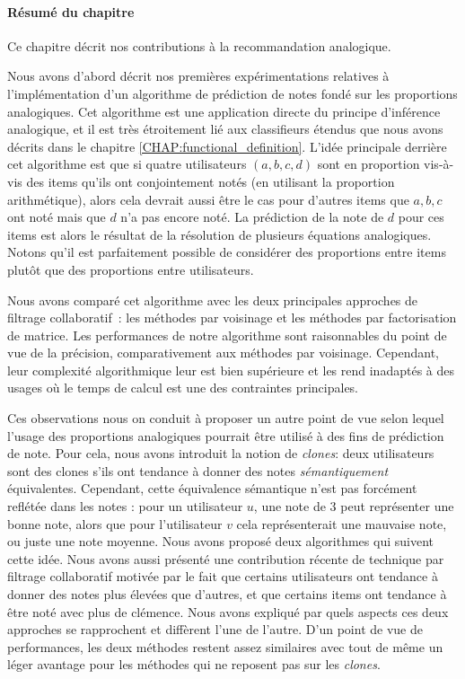 \paragraph{Résumé du chapitre}

Ce chapitre décrit nos contributions à la recommandation analogique.

Nous avons d'abord décrit nos premières expérimentations relatives  à
l'implémentation d'un algorithme de prédiction de notes fondé sur les
proportions analogiques. Cet algorithme est une application directe du principe
d'inférence analogique, et il est très étroitement lié aux classifieurs étendus
que nous avons décrits dans le chapitre \ref{CHAP:functional_definition}.
L'idée principale derrière cet algorithme est que si quatre utilisateurs $(a,
b, c, d)$ sont en proportion vis-à-vis des items qu'ils ont conjointement notés
(en utilisant la proportion arithmétique), alors cela devrait aussi être le cas
pour d'autres items que $a, b, c$ ont noté mais que $d$ n'a pas encore noté. La
prédiction de la note de $d$ pour ces items est alors le résultat de la
résolution de plusieurs équations analogiques. Notons qu'il est parfaitement
possible de considérer des proportions entre items plutôt que des proportions
entre utilisateurs.

Nous avons comparé cet algorithme avec les deux principales approches de
filtrage collaboratif~: les méthodes par voisinage et les méthodes par
factorisation de matrice. Les performances de notre algorithme sont raisonnables
du point de vue de la précision, comparativement aux méthodes par voisinage.
Cependant, leur complexité algorithmique leur est bien supérieure et les rend
inadaptés à des usages où le temps de calcul est une des contraintes
principales.

Ces observations nous on conduit à proposer un autre point de vue selon lequel
l'usage des proportions analogiques pourrait  être utilisé  à des fins de
prédiction de note. Pour cela, nous avons introduit la notion de
\textit{clones}: deux utilisateurs sont des clones s'ils ont tendance à donner
des notes \textit{sémantiquement} équivalentes. Cependant, cette équivalence
sémantique n'est pas forcément reflétée dans les notes : pour un utilisateur
$u$, une note  de $3$ peut représenter une bonne note, alors que pour
l'utilisateur $v$ cela représenterait une mauvaise note, ou juste une note
moyenne. Nous avons proposé deux algorithmes qui suivent cette idée. Nous avons
aussi présenté une contribution récente de technique par filtrage collaboratif
motivée par le fait que certains utilisateurs ont tendance à donner des notes
plus élevées que d'autres, et que certains items ont tendance à être noté avec
plus de clémence. Nous avons expliqué par quels aspects ces deux approches se
rapprochent et diffèrent l'une de l'autre. D'un point de vue de performances,
les deux méthodes restent assez similaires avec tout de même un léger avantage
pour les méthodes qui ne reposent pas sur les \textit{clones}.


